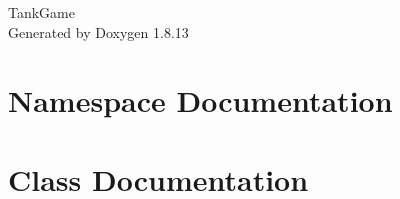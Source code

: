\documentclass[twoside]{book}
\newcommand{\+}{\discretionary{\mbox{\scriptsize$\hookleftarrow$}}{}{}}
\newcommand{\clearemptydoublepage}{%
  \newpage{\pagestyle{empty}\cleardoublepage}%
}
\begin{document}
\hypersetup{pageanchor=false,
             bookmarksnumbered=true,
             pdfencoding=unicode
            }
\begin{titlepage}
\vspace*{7cm}
\begin{center}%
{\Large Tank\+Game }\\
\vspace*{1cm}
{\large Generated by Doxygen 1.8.13}\\
\end{center}
\end{titlepage}
\clearemptydoublepage
{}
\tableofcontents
\clearemptydoublepage
{}
\hypersetup{pageanchor=true}

\chapter{Namespace Documentation}




\chapter{Class Documentation}






























\end{document}
